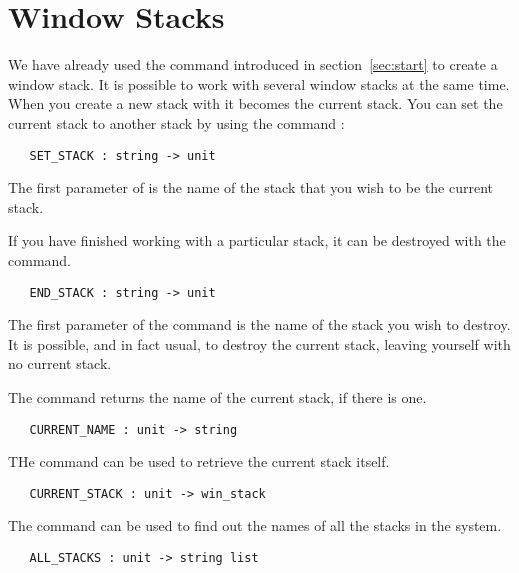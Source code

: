\section{Window Stacks}

We have already used the
 command
introduced in section~\ref{sec:start} to create a window stack.
It is possible to work with several window stacks at the same time.
When you create a new stack with
it becomes the current stack.
You can set the current stack to another stack by using the
command :
\begin{boxed}\begin{verbatim}
   SET_STACK : string -> unit
\end{verbatim}\end{boxed}
The first parameter of 
 is the name of
the stack that you wish to be the current stack.

If you have finished working with a particular stack,
it can be destroyed with the 
 command.
\begin{boxed}\begin{verbatim}
   END_STACK : string -> unit
\end{verbatim}\end{boxed}
The first parameter of the 
 command is the name
of the stack you wish to destroy.
It is possible, and in fact usual, to destroy the current stack, 
leaving yourself with no current stack.

The command 
returns the name of the current stack, if there is one.
\begin{boxed}\begin{verbatim}
   CURRENT_NAME : unit -> string
\end{verbatim}\end{boxed}
THe 
command can be used to retrieve the current stack itself.
\begin{boxed}\begin{verbatim}
   CURRENT_STACK : unit -> win_stack
\end{verbatim}\end{boxed}

The  command
can be used to find out the names of all the stacks in the system.
\begin{boxed}\begin{verbatim}
   ALL_STACKS : unit -> string list
\end{verbatim}\end{boxed}

